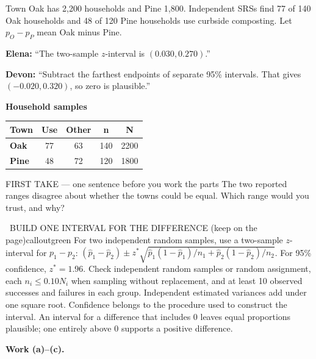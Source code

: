 \documentclass[11pt]{article}
\begin{document}


Town Oak has 2{,}200 households and Pine 1{,}800. Independent SRSs find 77 of 140 Oak households and 48 of 120 Pine households use curbside composting. Let $p_O-p_P$ mean Oak minus Pine.\par\smallskip \textbf{Elena:} ``The two-sample $z$-interval is $(0.030,0.270)$.''\par \textbf{Devon:} ``Subtract the farthest endpoints of separate 95\% intervals. That gives $(-0.020,0.320)$, so zero is plausible.''\par
\begin{center}
\textbf{Household samples}\par\smallskip
\begin{tabular}{|l|c|c|c|c|}
\hline
\textbf{Town} & \textbf{Use} & \textbf{Other} & \textbf{n} & \textbf{N} \\ \hline
\textbf{Oak} & 77 & 63 & 140 & 2200 \\ \hline
\textbf{Pine} & 48 & 72 & 120 & 1800 \\ \hline
\end{tabular}
\end{center}
\begin{firsttakebox}{FIRST TAKE --- one sentence before you work the parts}
The two reported ranges disagree about whether the towns could be equal. Which range would you trust, and why?
\workspace{0.9in}
\end{firsttakebox}

\begin{callout}{\IconBook\ BUILD ONE INTERVAL FOR THE DIFFERENCE (keep on the page)}{calloutgreen}
For two independent random samples, use a two-sample $z$-interval for $p_1-p_2$:
$(\hat p_1-\hat p_2)\pm z^*\sqrt{\hat p_1(1-\hat p_1)/n_1+\hat p_2(1-\hat p_2)/n_2}$.
For 95\% confidence, $z^*=1.96$. Check independent random samples or random assignment,
each $n_i\leq0.10N_i$ when sampling without replacement, and at least 10 observed successes and failures in each group.
Independent estimated variances add under one square root. Confidence belongs to the procedure used to construct the interval.
An interval for a difference that includes 0 leaves equal proportions plausible; one entirely above 0 supports a positive difference.
\end{callout}

\newpage
\textbf{Work (a)--(c).}\par\smallskip
\end{document}
